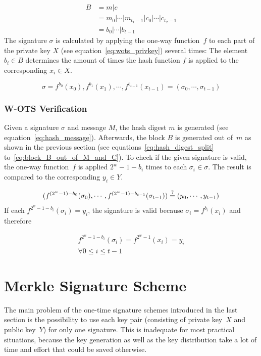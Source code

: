 \begin{align}
\label{eq:block_B_out_of_M_and_C}
B &= m | c  \\ 
&= m_0 | \cdots | m_{t_1 - 1} | c_0 | \cdots | c_{t_2 - 1} \nonumber \\
&= b_0 | \cdots | b_{t-1} \nonumber
\end{align}
The signature $\sigma$ is calculated by applying the one-way function~$f$ to each part of the private key $X$ (see equation~\ref{eq:wots_privkey}) several times: The element $b_i \in B$ determines the amount of times the hash function $f$ is applied to the corresponding $x_i \in X$.

\begin{equation}
\sigma = f^{b_0}(x_0), f^{b_1}(x_1), \cdots, f^{b_{t-1}}(x_{t-1}) = (\sigma_0, \cdots, \sigma_{t-1})
\end{equation}

\subsubsection{W-OTS Verification}
Given a signature $\sigma$ and message $M$, the hash digest $m$ is generated (see equation~\ref{eq:hash_message}). Afterwards, the block $B$ is generated out of~$m$ as shown in the previous section (see equations~\ref{eq:hash_digest_split} to~\ref{eq:block_B_out_of_M_and_C}). To check if the given signature is valid, the one-way function~$f$ is applied $2^w - 1 - b_i$ times to each $\sigma_i \in \sigma$. The result is compared to the corresponding $y_i \in Y$.

\begin{equation}
(f^{(2^w-1)-b_0}(\sigma_0), \cdots, f^{(2^w - 1) - b_{t-1}}(\sigma_{t-1})) \stackrel{?}{=} (y_0, \cdots, y_{t-1})
\end{equation}
If each $f^{2^w-1-b_i}(\sigma_i) = y_i$, the signature is valid because $\sigma_i = f^{b_i}(x_i)$ and therefore

\begin{gather}
f^{2^w-1-b_i}(\sigma_i) = f^{2^w-1}(x_i) = y_i \\
\forall 0 \leq i \leq t-1 \nonumber
\end{gather}



\section{Merkle Signature Scheme} %
The main problem of the one-time signature schemes introduced in the last section is the possibility to use each key pair (consisting of private key~$X$ and public key~$Y$) for only one signature. This is inadequate for most practical situations, because the key generation as well as the key distribution take a lot of time and effort that could be saved otherwise.

